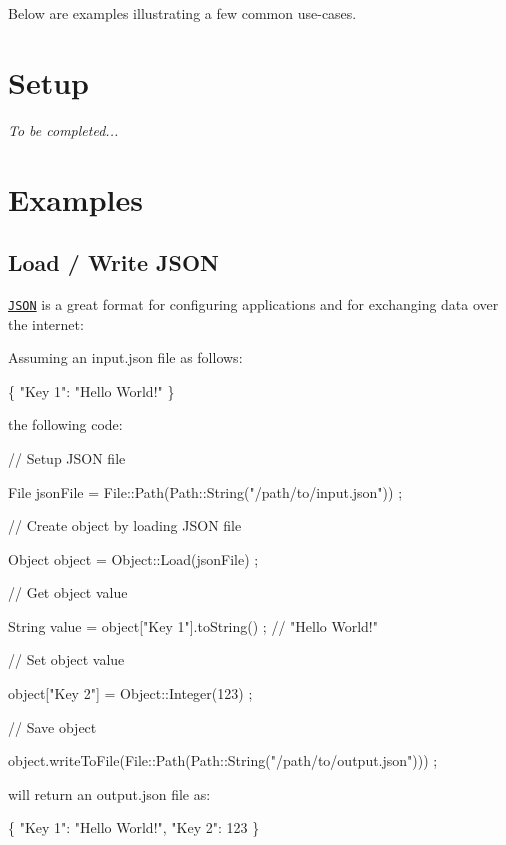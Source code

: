 Below are examples illustrating a few common use-\/cases.\hypertarget{md_docs__tutorial_Setup}{}\section{Setup}\label{md_docs__tutorial_Setup}
{\itshape To be completed...}\hypertarget{md_docs__tutorial_Examples}{}\section{Examples}\label{md_docs__tutorial_Examples}
\hypertarget{md_docs__tutorial_JSON}{}\subsection{Load / Write J\+S\+ON}\label{md_docs__tutorial_JSON}
\href{https://en.wikipedia.org/wiki/JSON}{\tt J\+S\+ON} is a great format for configuring applications and for exchanging data over the internet\+:

Assuming an {\ttfamily input.\+json} file as follows\+:


\begin{DoxyCode}
\{
    "Key 1": "Hello World!"
\}
\end{DoxyCode}


the following code\+:


\begin{DoxyCode}
\textcolor{comment}{// Setup JSON file}

File jsonFile = File::Path(Path::String(\textcolor{stringliteral}{"/path/to/input.json"})) ;

\textcolor{comment}{// Create object by loading JSON file}

Object \textcolor{keywordtype}{object} = Object::Load(jsonFile) ;

\textcolor{comment}{// Get object value}

String value = \textcolor{keywordtype}{object}[\textcolor{stringliteral}{"Key 1"}].toString() ; \textcolor{comment}{// "Hello World!"}

\textcolor{comment}{// Set object value}

\textcolor{keywordtype}{object}[\textcolor{stringliteral}{"Key 2"}] = Object::Integer(123) ;

\textcolor{comment}{// Save object}

\textcolor{keywordtype}{object}.writeToFile(File::Path(Path::String(\textcolor{stringliteral}{"/path/to/output.json"}))) ;
\end{DoxyCode}


will return an {\ttfamily output.\+json} file as\+:


\begin{DoxyCode}
\{
    "Key 1": "Hello World!",
    "Key 2": 123
\}
\end{DoxyCode}
 